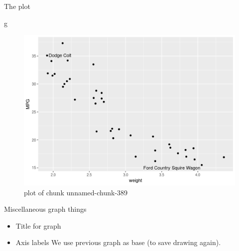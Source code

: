 \documentclass[ignorenonframetext,]{beamer}
\newenvironment{Shaded}{\begin{snugshade}}{\end{snugshade}}
\newcommand{\NormalTok}[1]{#1}
\providecommand{\tightlist}{%
  \setlength{\itemsep}{0pt}\setlength{\parskip}{0pt}}
\begin{document}
\begin{frame}[fragile]{The plot}
\protect\hypertarget{the-plot-7}{}

\begin{Shaded}
\begin{Highlighting}[]
\NormalTok{g}
\end{Highlighting}
\end{Shaded}

\begin{figure}
\centering
\includegraphics{figure/unnamed-chunk-389-1.png}
\caption{plot of chunk unnamed-chunk-389}
\end{figure}

\end{frame}

\begin{frame}{Miscellaneous graph things}
\protect\hypertarget{miscellaneous-graph-things}{}

\begin{itemize}
\tightlist
\item
  Title for graph
\item
  Axis labels We use previous graph as base (to save drawing again).
\end{itemize}

\end{frame}
\end{document}
